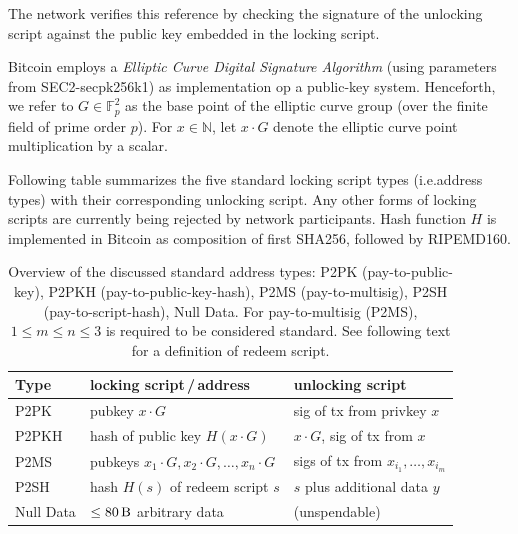 \documentclass[a4paper,11pt,titlepage]{scrbook}
\begin{document}
The network verifies this reference by checking the signature of the unlocking script against the public key embedded in the locking script.


Bitcoin employs a \emph{Elliptic Curve Digital Signature Algorithm} (using parameters from SEC2-secpk256k1) as implementation op a public-key system.
Henceforth, we refer to $G\in \mathbb{F}_p^2$ as the base point of the elliptic curve group (over the finite field of prime order $p$). For $x\in \mathbb{N}$, let $x\cdot G$ denote the elliptic curve point multiplication by a scalar.

Following table summarizes the five standard locking script types (i.e.\@ address types) with their corresponding unlocking script. Any other forms of locking scripts are currently being rejected by network participants.
Hash function $H$ is implemented in Bitcoin as composition of first SHA256, followed by RIPEMD160.

\begin{table}
    \renewcommand{\arraystretch}{1.2}
    \centering
    \begin{tabular}{lll}
        \toprule
        \textbf{Type} & \textbf{locking script\,/\,address} & \textbf{unlocking script} \\
        \midrule
        P2PK & pubkey $x\cdot G$ & sig of tx from privkey $x$ \\
        P2PKH & hash of public key $H(x\cdot G)$ & $x\cdot G$, sig of tx from $x$ \\
        P2MS & pubkeys $x_1{\cdot} G, x_2{\cdot} G, \dots, x_n{\cdot} G$ & sigs of tx from $x_{i_1}, \dots, x_{i_m}$ \\
        P2SH & hash $H(s)$ of redeem script $s$ & $s$ plus additional data $y$ \\
        Null Data & $\leq \SI{80}{\byte}$ arbitrary data & (unspendable)\\
        \bottomrule
    \end{tabular}
    \caption[Overview of the discussed standard address types]{Overview of the discussed standard address types: P2PK (pay-to-public-key), P2PKH (pay-to-public-key-hash), P2MS (pay-to-multisig), P2SH (pay-to-script-hash), Null Data. For pay-to-multisig (P2MS), $1\leq m\leq n\leq 3$ is required to be considered standard. See following text for a definition of redeem script.}
    \label{table:script-types}
\end{table}
\end{document}
